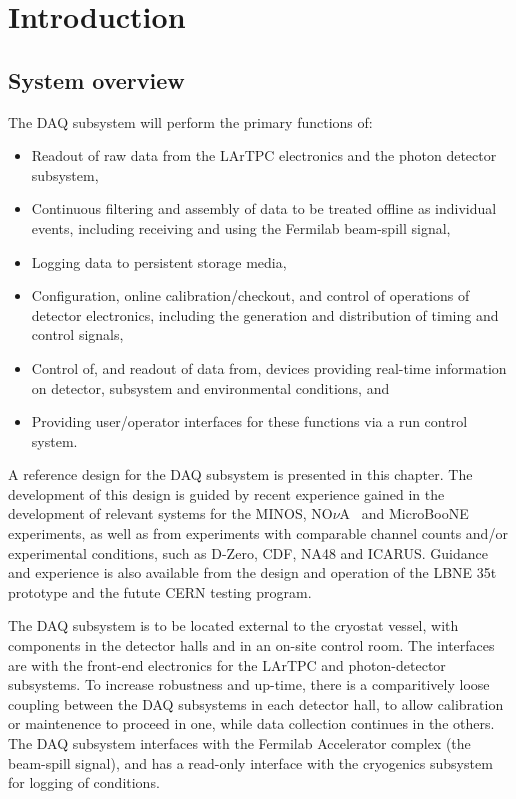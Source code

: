\section{Introduction}
\label{sec:daq_intro}

\subsection{System overview}

The DAQ subsystem will perform the primary functions of:

\begin{itemize}
  \item Readout of raw data from the LArTPC electronics and the photon
    detector subsystem,

  \item Continuous filtering and assembly of data to be treated
    offline as individual events, including receiving and using the
    Fermilab beam-spill signal, 

  \item Logging data to persistent storage media,

  \item Configuration, online calibration/checkout, and control of 
        operations of detector electronics, including the generation 
        and distribution of timing and control signals,

  \item Control of, and readout of data from, devices 
        providing real-time information on detector, subsystem 
        and environmental conditions, and  

  \item Providing user/operator interfaces for these functions via 
        a run control system.
\end{itemize}

A reference design for the DAQ subsystem is presented in this chapter.
The development of this design is guided by recent experience gained
in the development of relevant systems for the MINOS,
NO$\nu$A~\cite{novatdr} and MicroBooNE~\cite{microboonecdr}
experiments, as well as from experiments with comparable channel
counts and/or experimental conditions, such as D-Zero, CDF, NA48 and
ICARUS.  Guidance and experience is also available from the design and
operation of the LBNE 35t prototype and the futute CERN testing
program.

The DAQ subsystem is to be located external to the cryostat vessel,
with components in the detector halls and in an on-site control
room.
The interfaces are with the front-end electronics for the LArTPC and
photon-detector subsystems.  To increase robustness and up-time, there
is a comparitively loose coupling between the DAQ subsystems in each
detector hall, to allow calibration or maintenence to proceed in one,
while data collection continues in the others.  The DAQ subsystem
interfaces with the Fermilab Accelerator complex (the beam-spill
signal), and has a read-only interface with the cryogenics subsystem
for logging of conditions.  

